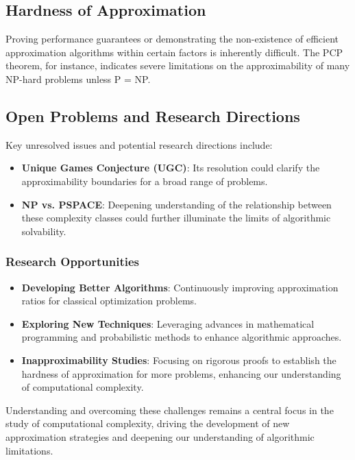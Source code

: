 \documentclass[12pt]{book} %
\begin{document}
\subsection{Hardness of Approximation}

Proving performance guarantees or demonstrating the non-existence of efficient approximation algorithms within certain factors is inherently difficult. The PCP theorem, for instance, indicates severe limitations on the approximability of many NP-hard problems unless P = NP.

\subsection{Open Problems and Research Directions}

Key unresolved issues and potential research directions include:

\begin{itemize}
    \item \textbf{Unique Games Conjecture (UGC)}: Its resolution could clarify the approximability boundaries for a broad range of problems.
    \item \textbf{NP vs. PSPACE}: Deepening understanding of the relationship between these complexity classes could further illuminate the limits of algorithmic solvability.
\end{itemize}

\subsubsection{Research Opportunities}
\begin{itemize}
    \item \textbf{Developing Better Algorithms}: Continuously improving approximation ratios for classical optimization problems.
    \item \textbf{Exploring New Techniques}: Leveraging advances in mathematical programming and probabilistic methods to enhance algorithmic approaches.
    \item \textbf{Inapproximability Studies}: Focusing on rigorous proofs to establish the hardness of approximation for more problems, enhancing our understanding of computational complexity.
\end{itemize}

Understanding and overcoming these challenges remains a central focus in the study of computational complexity, driving the development of new approximation strategies and deepening our understanding of algorithmic limitations.
\end{document}
